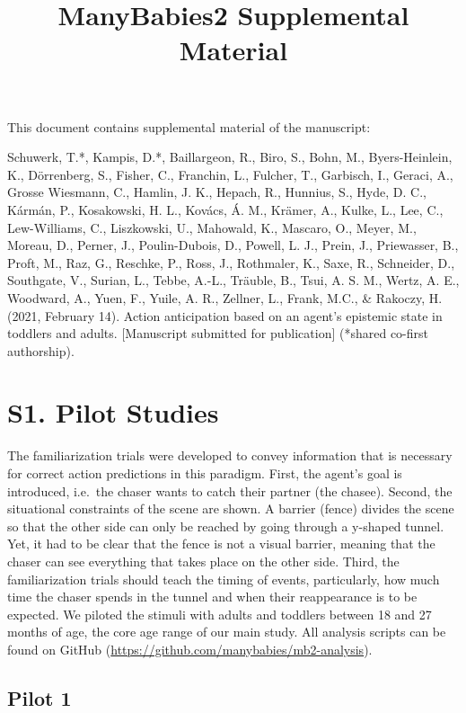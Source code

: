 \documentclass[
  man, donotrepeattitle,floatsintext]{apa6}
\title{ManyBabies2 Supplemental Material}
\author{\phantom{0}}
\date{}
\affiliation{\phantom{0}}
\begin{document}
\maketitle

This document contains supplemental material of the manuscript:

Schuwerk, T.*, Kampis, D.*, Baillargeon, R., Biro, S., Bohn, M., Byers-Heinlein, K., Dörrenberg, S., Fisher, C., Franchin, L., Fulcher, T., Garbisch, I., Geraci, A., Grosse Wiesmann, C., Hamlin, J. K., Hepach, R., Hunnius, S., Hyde, D. C., Kármán, P., Kosakowski, H. L., Kovács, Á. M., Krämer, A., Kulke, L., Lee, C., Lew-Williams, C., Liszkowski, U., Mahowald, K., Mascaro, O., Meyer, M., Moreau, D., Perner, J., Poulin-Dubois, D., Powell, L. J., Prein, J., Priewasser, B., Proft, M., Raz, G., Reschke, P., Ross, J., Rothmaler, K., Saxe, R., Schneider, D., Southgate, V., Surian, L., Tebbe, A.-L., Träuble, B., Tsui, A. S. M., Wertz, A. E., Woodward, A., Yuen, F., Yuile, A. R., Zellner, L., Frank, M.C., \& Rakoczy, H. (2021, February 14). Action anticipation based on an agent's epistemic state in toddlers and adults. {[}Manuscript submitted for publication{]} (*shared co-first authorship).

\section{S1. Pilot Studies}\label{s1.-pilot-studies}

The familiarization trials were developed to convey information that is necessary for correct action predictions in this paradigm. First, the agent's goal is introduced, i.e.~the chaser wants to catch their partner (the chasee). Second, the situational constraints of the scene are shown. A barrier (fence) divides the scene so that the other side can only be reached by going through a y-shaped tunnel. Yet, it had to be clear that the fence is not a visual barrier, meaning that the chaser can see everything that takes place on the other side. Third, the familiarization trials should teach the timing of events, particularly, how much time the chaser spends in the tunnel and when their reappearance is to be expected. We piloted the stimuli with adults and toddlers between 18 and 27 months of age, the core age range of our main study. All analysis scripts can be found on GitHub (\url{https://github.com/manybabies/mb2-analysis}).

\subsection{Pilot 1}\label{pilot-1}
\end{document}
